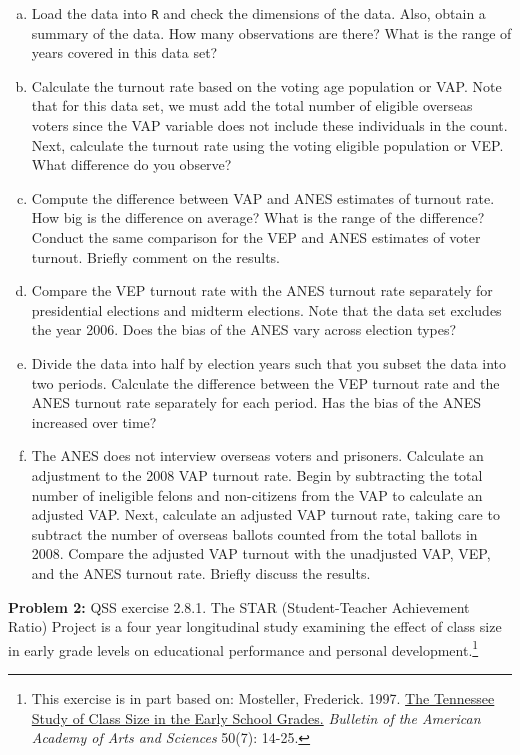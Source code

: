 \documentclass[11pt]{article}
\begin{document}
\vspace{2mm}
\begin{enumerate}[a.]
	\item Load the data into {\tt R} and check the dimensions of the data.
  Also, obtain a summary of the data.  How many observations are
  there?  What is the range of years covered in this data set?
  \item Calculate the turnout rate based on the voting age population or
  VAP. Note that for this data set, we must add the total number of
  eligible overseas voters since the VAP variable does not
  include these individuals in the count. Next, calculate the turnout
  rate using the voting eligible population or VEP.  What difference
  do you observe?
  \item Compute the difference between VAP and ANES estimates of turnout
  rate.  How big is the difference on average?  What is the range of
  the difference?  Conduct the same comparison for the VEP and ANES
  estimates of voter turnout.  Briefly comment on the results.
  \item Compare the VEP turnout rate with the ANES turnout rate
  separately for presidential elections and midterm elections.  Note
  that the data set excludes the year 2006. Does the bias of the ANES vary across election types?
  \item Divide the data into half by election years such that you subset
  the data into two periods.  Calculate the difference between the VEP
  turnout rate and the ANES turnout rate separately for each period.  Has the bias of the ANES increased over time?
  \item The ANES does not interview overseas voters and
  prisoners. Calculate an adjustment to the 2008 VAP turnout
  rate. Begin by subtracting the total number of ineligible felons and
  non-citizens from the VAP to calculate an adjusted VAP. Next,
  calculate an adjusted VAP turnout rate, taking care to subtract the
  number of overseas ballots counted from the total ballots in 2008.
  Compare the adjusted VAP turnout with the unadjusted VAP, VEP, and
  the ANES turnout rate. Briefly discuss the results.
\end{enumerate}

\vspace{7mm}
\noindent \textbf{Problem 2:} QSS exercise 2.8.1.  The STAR (Student-Teacher Achievement Ratio) Project is a four year
longitudinal study examining the effect of class size in early
grade levels on educational performance and personal
development.\footnote{This exercise is in part based on:
 Mosteller, Frederick. 1997. \href{http://dx.doi.org/10.2307/3824562}{The Tennessee Study of Class Size in the 
 Early School Grades.} \textit{Bulletin of 
 the American Academy of Arts and Sciences} 50(7): 14-25.}
  
\end{document}
